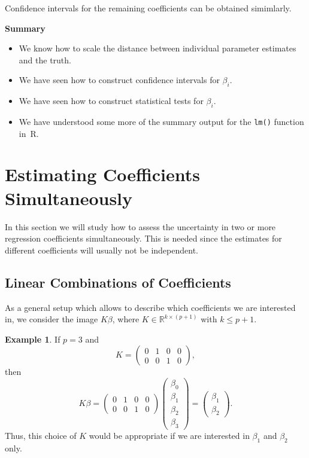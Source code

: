 \documentclass[
  a4paper,
]{article}
\providecommand{\tightlist}{%
  \setlength{\itemsep}{0pt}\setlength{\parskip}{0pt}}
\theoremstyle{definition}
\theoremstyle{definition}
\newtheorem{example}{Example}[section]
\theoremstyle{definition}
\theoremstyle{definition}
\theoremstyle{remark}
\begin{document}
Confidence intervals for the remaining coefficients can be obtained simimlarly.

\textbf{Summary}

\begin{itemize}
\tightlist
\item
  We know how to scale the distance between individual parameter estimates
  and the truth.
\item
  We have seen how to construct confidence intervals for \(\beta_i\).
\item
  We have seen how to construct statistical tests for \(\beta_i\).
\item
  We have understood some more of the summary output for the \texttt{lm()}
  function in~R.
\end{itemize}

\clearpage

\hypertarget{S06-simultaneous}{%
\section{Estimating Coefficients Simultaneously}\label{S06-simultaneous}}

In this section we will study how to assess the uncertainty in two or more
regression coefficients simultaneously. This is needed since the estimates for
different coefficients will usually not be independent.

\hypertarget{sec:simult-dist}{%
\subsection{Linear Combinations of Coefficients}\label{sec:simult-dist}}

As a general setup which allows to describe which coefficients we are
interested in, we consider the image \(K\beta\), where \(K \in \mathbb{R}^{k \times (p+1)}\) with \(k \leq p+1\).

\begin{example}
If \(p = 3\) and
\begin{equation*}
  K = \begin{pmatrix}
    0 & 1 & 0 & 0 \\
    0 & 0 & 1 & 0
  \end{pmatrix},
\end{equation*}
then
\begin{equation*}
  K\beta
  = \begin{pmatrix}
      0 & 1 & 0 & 0 \\
      0 & 0 & 1 & 0
    \end{pmatrix} \begin{pmatrix}
      \beta_0 \\ \beta_1 \\ \beta_2 \\ \beta_3
    \end{pmatrix}
  = \begin{pmatrix}
      \beta_1 \\ \beta_2
    \end{pmatrix}.
\end{equation*}
Thus, this choice of \(K\) would be appropriate if we are interested
in \(\beta_1\) and \(\beta_2\) only.
\end{example}
\end{document}

